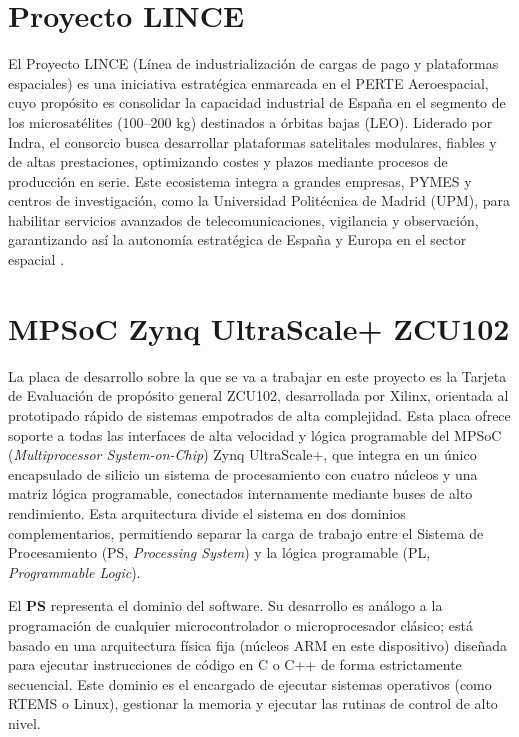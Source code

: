 \section{Proyecto LINCE}

El Proyecto LINCE (Línea de industrialización de cargas de pago y plataformas espaciales) es
una iniciativa estratégica enmarcada en el PERTE Aeroespacial, cuyo propósito es consolidar
la capacidad industrial de España en el segmento de los microsatélites (100--200 kg)
destinados a órbitas bajas (LEO). Liderado por Indra, el consorcio busca desarrollar
plataformas satelitales modulares, fiables y de altas prestaciones, optimizando costes y
plazos mediante procesos de producción en serie. Este ecosistema integra a grandes
empresas, PYMES y centros de investigación, como la Universidad Politécnica de Madrid
(UPM), para habilitar servicios avanzados de telecomunicaciones, vigilancia y observación,
garantizando así la autonomía estratégica de España y Europa en el sector espacial
\cite{indra2026lince}.

\section{MPSoC Zynq UltraScale+ ZCU102}

La placa de desarrollo sobre la que se va a trabajar en este proyecto es la Tarjeta de
Evaluación de propósito general ZCU102, desarrollada por Xilinx, orientada al prototipado
rápido de sistemas empotrados de alta complejidad. Esta placa ofrece soporte a todas las
interfaces de alta velocidad y lógica programable del MPSoC (\textit{Multiprocessor System-on-Chip})
Zynq UltraScale+, que integra en un único encapsulado de silicio un sistema de
procesamiento con cuatro núcleos y una matriz lógica programable, conectados internamente
mediante buses de alto rendimiento. Esta arquitectura divide el sistema en dos dominios
complementarios, permitiendo separar la carga de trabajo entre el Sistema de Procesamiento
(PS, \textit{Processing System}) y la lógica programable (PL, \textit{Programmable Logic}).

El \textbf{PS} representa el dominio del software. Su desarrollo es análogo a la programación de
cualquier microcontrolador o microprocesador clásico; está basado en una arquitectura física
fija (núcleos ARM en este dispositivo) diseñada para ejecutar instrucciones de código en C o
C++ de forma estrictamente secuencial. Este dominio es el encargado de ejecutar sistemas
operativos (como RTEMS o Linux), gestionar la memoria y ejecutar las rutinas de control de
alto nivel.

